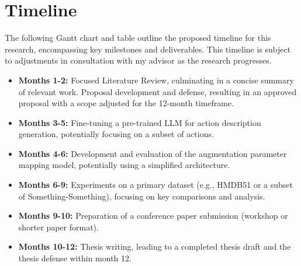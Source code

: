 \section{Timeline}

The following Gantt chart and table outline the proposed timeline for this research, encompassing key milestones and deliverables. This timeline is subject to adjustments in consultation with my advisor as the research progresses.

\begin{itemize}
    \item \textbf{Months 1-2:} Focused Literature Review, culminating in a concise summary of relevant work. Proposal development and defense, resulting in an approved proposal with a scope adjusted for the 12-month timeframe.
    \item \textbf{Months 3-5:} Fine-tuning a pre-trained LLM for action description generation, potentially focusing on a subset of actions.
    \item \textbf{Months 4-6:} Development and evaluation of the augmentation parameter mapping model, potentially using a simplified architecture.
    \item \textbf{Months 6-9:} Experiments on a primary dataset (e.g., HMDB51 or a subset of Something-Something), focusing on key comparisons and analysis.
    \item \textbf{Months 9-10:} Preparation of a conference paper submission (workshop or shorter paper format).
    \item \textbf{Months 10-12:} Thesis writing, leading to a completed thesis draft and the thesis defense within month 12.
\end{itemize}